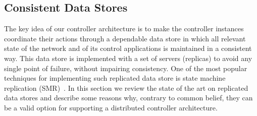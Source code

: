 \begin{itemize}




\section{Consistent Data Stores}
\glsresetall
\label{sec:relatedWork:consistentDataStore}
The key idea of our controller architecture is to make the controller instances coordinate their actions through a dependable data store in which all relevant state of the network and of its control applications is maintained in a consistent way.
This data store is implemented with a set of servers (replicas) to avoid any single point of failure, without impairing consistency.
One of the most popular techniques for implementing such replicated data store is state machine replication (SMR)~\cite{Sch90,Lam98}.
In this section we review the state of the art on replicated data stores and describe some reasons why, contrary to common belief, they can be a valid option for supporting a distributed controller architecture.


\end{itemize}
